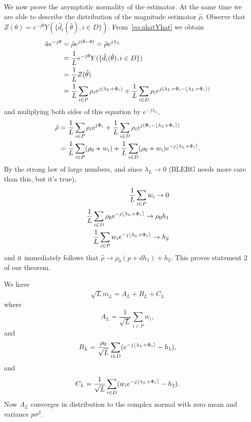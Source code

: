 \documentclass[a4paper,10pt]{article}
\begin{document}
We now prove the asymptotic normality of the estimator.  At the same time we are able to describe the distribution of the magnitude estimator $\hat{\rho}$.  Observe that $Z(\theta) = e^{-j\theta}Y(\{\hat{d}_i(\hat{\theta}), i \in D\})$.  From~\eqref{eq:ahatYhat} we obtain
\begin{align}\label{eq:hata}
\hat{a} e^{-j\theta} &= \hat{\rho} e^{j(\hat{\theta} - \theta)} = \hat{\rho} e^{j\lambda_L} \nonumber \\
&= \frac{1}{L} e^{-j\theta} Y(\{\hat{d}_i(\hat{\theta}), i \in D\}) \nonumber \\
&= \frac{1}{L}  Z(\hat{\theta}) \nonumber \\
&= \frac{1}{L} \sum_{i \in P} \rho_i e^{j(\lambda_L + \Phi_i)} + \frac{1}{L}  \sum_{i \in D}  \rho_i e^{j( \lambda_L + \Phi_i - {\left\lfloor \lambda_L + \Phi_i \right\rceil})} \label{eq:ahatfornorm}
\end{align}
and muliplying both sides of this equation by $e^{-j\lambda_L}$,
\begin{align*}\label{eq:hatrhoworking}
\hat{\rho} &=  \frac{1}{L} \sum_{i \in P} \rho_i e^{j\Phi_i} + \frac{1}{L}  \sum_{i \in D}  \rho_i e^{j(\Phi_i - {\left\lfloor \lambda_L + \Phi_i \right\rceil})} \\
 &=  \frac{1}{L} \sum_{i \in P} (\rho_0 + w_i) + \frac{1}{L}  \sum_{i \in D}  (\rho_0 + w_i)e^{-j{\left\lfloor \lambda_L + \Phi_i \right\rceil}}.
\end{align*}
By the strong law of large numbers, and since $\lambda_L \rightarrow 0$ (BLERG needs more care than this, but it's true),
\begin{align*}
\frac{1}{L}\sum_{i \in P}w_i \rightarrow 0 \\
\frac{1}{L}\sum_{i \in D}\rho_0e^{-j{\left\lfloor \lambda_L + \Phi_i \right\rceil}} \rightarrow  \rho_0 h_1 \\
\frac{1}{L}\sum_{i \in P}w_i e^{-j{\left\lfloor \lambda_L + \Phi_i \right\rceil}} \rightarrow h_2 \\
\end{align*}
and it immediately follows that $\hat{\rho} \rightarrow \rho_0( p + d h_1 ) + h_2$.  This proves statement 2 of our theorem.

We have
\begin{align*}
\sqrt{L} m_L =  A_L + B_L +  C_L
\end{align*}
where
\[
A_L = \frac{1}{\sqrt{L}} \sum_{i \in P}w_i,
\]
and
\[
B_L = \frac{\rho_0}{\sqrt{L}} \sum_{i \in D}(e^{-j{\left\lfloor \lambda_L + \Phi_i \right\rceil}} - h_1),
\]
and
\[
C_L = \frac{1}{\sqrt{L}} \sum_{i \in D}(w_i e^{-j{\left\lfloor \lambda_L + \Phi_i \right\rceil}} - h_2).
\]
Now $A_L$ converges in distribution to the complex normal with zero mean and variance $p\sigma^2$.
\end{document}
